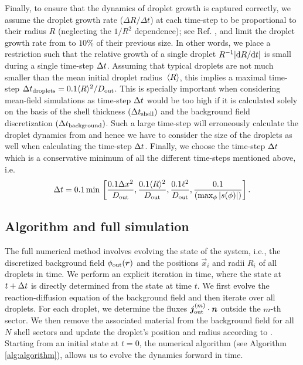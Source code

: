 Finally, to ensure that the dynamics of droplet growth is captured correctly, we assume the droplet growth rate ($\Delta R / \Delta t$) at each time-step to be proportional to their radius $R$ (neglecting the $1/R^2$ dependence); see Ref. \cite{Review2019}, and limit the droplet growth rate from  to $10\%$ of their previous size.
In other words, we place a restriction such that the relative growth of a single droplet $R^{-1}|\mathrm{d} R/\mathrm{d} t|$ is small during a single time-step $\Delta t$.
Assuming that typical droplets are not much smaller than the mean initial droplet radius~$\langle R\rangle$, this implies a maximal time-step $\Delta t_\mathrm{droplets} = 0.1 \langle R\rangle^2/D_\mathrm{out}$.
This is specially important when considering mean-field simulations as time-step $\Delta t$ would be too high if it is calculated solely on the basis of the shell thickness $(\Delta t_\mathrm{shell})$ and the background field discretization $(\Delta t_\mathrm{background})$.
Such a large time-step will erroneously calculate the droplet dynamics from  and hence we have to consider the size of the droplets as well when calculating the time-step $\Delta t$.
Finally, we choose the time-step $\Delta t$ which is a conservative minimum of all the different time-steps mentioned above, i.e.
\begin{equation}
\label{eqn:time_step}
    \Delta t = 0.1 \, \mathrm{min \, }\left[  \frac{0.1 \Delta x^2}{D_\mathrm{out}}, \frac{0.1 \langle R\rangle^2}{D_\mathrm{out}}, \frac{0.1 \ell^2}{D_\mathrm{out}}, \frac{0.1}{(\max_\phi |s(\phi)|)} \right ].
\end{equation}

\subsection{Algorithm and full simulation}

The full numerical method involves evolving the state of the system, i.e., the discretized background field $\phi_\mathrm{out}(\boldsymbol{r})$ and the positions $\vec{x}_i$ and radii $R_i$ of all droplets in time.
We perform an explicit iteration in time, where the state at $t + \Delta t$ is directly determined from the state at time $t$.
We first evolve the reaction-diffusion equation  of the background field and then iterate over all droplets.
For each droplet, we determine the fluxes $\boldsymbol{j}_\mathrm{out}^{(m)} \cdot \boldsymbol{n}$ outside the $m$-th sector. We then remove the associated material from the background field for all $N$ shell sectors and update the droplet's position and radius according to .
Starting from an initial state at $t=0$, the numerical algorithm (see Algorithm \ref{alg:algorithm}), allows us to evolve the dynamics forward in time.

